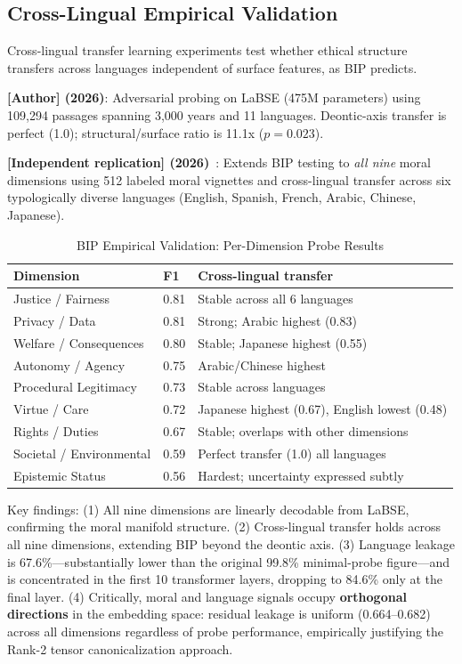 \documentclass[conference]{IEEEtran}
\begin{document}
\subsection{Cross-Lingual Empirical Validation}

Cross-lingual transfer learning experiments test whether ethical structure transfers across languages independent of surface features, as BIP predicts.

\textbf{[Author] (2026)}: Adversarial probing on LaBSE (475M parameters) using 109,294 passages spanning 3,000 years and 11 languages. Deontic-axis transfer is perfect (1.0); structural/surface ratio is 11.1x ($p=0.023$).

\textbf{[Independent replication] (2026)}~\cite{thiele2026}: Extends BIP testing to \emph{all nine} moral dimensions using 512 labeled moral vignettes and cross-lingual transfer across six typologically diverse languages (English, Spanish, French, Arabic, Chinese, Japanese).

\begin{table}[t]
\caption{BIP Empirical Validation: Per-Dimension Probe Results}
\label{tab:bip-results}
\centering
\footnotesize
\begin{tabular}{@{}p{2.8cm}p{0.8cm}p{3.5cm}@{}}
\toprule
Dimension & F1 & Cross-lingual transfer \\
\midrule
Justice / Fairness & 0.81 & Stable across all 6 languages \\
Privacy / Data & 0.81 & Strong; Arabic highest (0.83) \\
Welfare / Consequences & 0.80 & Stable; Japanese highest (0.55) \\
Autonomy / Agency & 0.75 & Arabic/Chinese highest \\
Procedural Legitimacy & 0.73 & Stable across languages \\
Virtue / Care & 0.72 & Japanese highest (0.67), English lowest (0.48) \\
Rights / Duties & 0.67 & Stable; overlaps with other dimensions \\
Societal / Environmental & 0.59 & Perfect transfer (1.0) all languages \\
Epistemic Status & 0.56 & Hardest; uncertainty expressed subtly \\
\bottomrule
\end{tabular}
\end{table}

Key findings: (1) All nine dimensions are linearly decodable from LaBSE, confirming the moral manifold structure. (2) Cross-lingual transfer holds across all nine dimensions, extending BIP beyond the deontic axis. (3) Language leakage is 67.6\%---substantially lower than the original 99.8\% minimal-probe figure---and is concentrated in the first 10 transformer layers, dropping to 84.6\% only at the final layer. (4) Critically, moral and language signals occupy \textbf{orthogonal directions} in the embedding space: residual leakage is uniform (0.664--0.682) across all dimensions regardless of probe performance, empirically justifying the Rank-2 tensor canonicalization approach.
\end{document}
